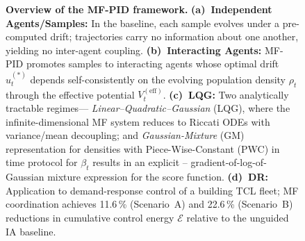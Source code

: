 \documentclass[11pt,onecolumn]{article}
\newcommand{\MF}{\mathrm{MF}}
\newcommand{\IA}{\mathrm{IA}}
\begin{document}
\begin{figure}[t]
\caption*{\textbf{Overview of the MF-PID framework.}
  \textbf{(a)~Independent Agents/Samples:} In the baseline, each sample
  evolves under a pre-computed drift; trajectories carry no information
  about one another, yielding no inter-agent coupling.
  \textbf{(b)~Interacting Agents:} MF-PID promotes samples to
  interacting agents whose optimal drift $u^{(*)}_t$ depends
  self-consistently on the evolving population density $\rho_t$ through
  the effective potential $V^{(\mathrm{eff})}_t$.
  \textbf{(c)~LQG:} Two analytically tractable regimes---
  \emph{Linear--Quadratic--Gaussian} (LQG), where the
  infinite-dimensional MF system reduces to Riccati ODEs with
  variance/mean decoupling; and \emph{Gaussian-Mixture} (GM) representation for densities with Piece-Wise-Constant (PWC) in time protocol for $\beta_t$ results in an explicit -- gradient-of-log-of-Gaussian mixture expression for the score function.
  \textbf{(d)~DR:} Application to demand-response control of a
  building TCL fleet; MF coordination achieves 11.6\,\% (Scenario~A)
  and 22.6\,\% (Scenario~B) reductions in cumulative control energy
  $\mathcal{E}$ relative to the unguided IA baseline.}
\label{fig:overview}
\end{figure}

%

\end{document}
